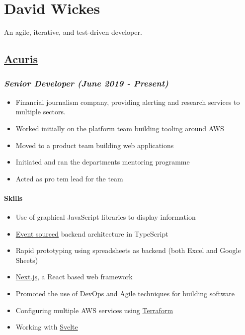\documentclass[11pt]{article}
\author{gypsydave5}
\date{\today}
\title{}
\begin{document}
\section*{David Wickes}
\label{sec:org6042271}
An agile, iterative, and test-driven developer.

\subsection*{\href{http://www.acuris.com/}{Acuris}}
\label{sec:org049ed7c}
\subsubsection*{\emph{Senior Developer (June 2019 - Present)}}
\label{sec:org78bc3dd}
\begin{itemize}
\item Financial journalism company, providing alerting and research services to multiple sectors.
\item Worked initially on the platform team building tooling around AWS
\item Moved to a product team building web applications
\item Initiated and ran the departments mentoring programme
\item Acted as pro tem lead for the team
\end{itemize}

\paragraph*{Skills}
\label{sec:org9f2a36f}
\begin{itemize}
\item Use of graphical JavaScript libraries to display information
\item \href{https://martinfowler.com/eaaDev/EventSourcing.html}{Event sourced} backend architecture in TypeScript
\item Rapid prototyping using spreadsheets as backend (both Excel and Google Sheets)
\item \href{https://nextjs.org/}{Next.js}, a React based web framework
\item Promoted the use of DevOps and Agile techniques for building software
\item Configuring multiple AWS services using \href{https://www.terraform.io/}{Terraform}
\item Working with \href{https://svelte.dev/}{Svelte}
\end{itemize}
\end{document}
